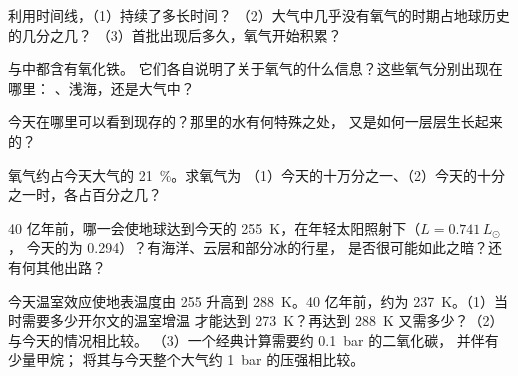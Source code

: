 \begin{exercise}[$\star\star$]\label{exo:g12:early-earth:8}
 利用时间线，（1）持续了多长时间？
 （2）大气中几乎没有氧气的时期占地球历史的几分之几？
 （3）首批出现后多久，氧气开始积累？
\end{exercise}

\begin{exercise}[$\star\star$]\label{exo:g12:early-earth:9}
 与中都含有氧化铁。
 它们各自说明了关于氧气的什么信息？这些氧气分别出现在哪里：
 、浅海，还是大气中？
\end{exercise}

\begin{exercise}[$\star\star$]\label{exo:g12:early-earth:10}
 今天在哪里可以看到现存的？那里的水有何特殊之处，
 又是如何一层层生长起来的？
\end{exercise}

\begin{exercise}[$\star\star$]\label{exo:g12:early-earth:11}
 氧气约占今天大气的 \qty{21}{\percent}。求氧气为
 （1）今天的十万分之一、（2）今天的十分之一时，各占百分之几？
\end{exercise}

\begin{exercise}[$\star\star\star$]\label{exo:g12:early-earth:12}
 40 亿年前，哪一会使地球达到今天的
 \qty{255}{K}，在年轻太阳照射下（$L = 0.741\,L_\odot$，
 今天的为 0.294）？有海洋、云层和部分冰的行星，
 是否很可能如此之暗？还有何其他出路？
\end{exercise}

\begin{exercise}[$\star\star\star$]\label{exo:g12:early-earth:13}
 今天温室效应使地表温度由 255 升高到
 \qty{288}{K}。40 亿年前，约为
 \qty{237}{K}。（1）当时需要多少开尔文的温室增温
 才能达到 \qty{273}{K}？再达到 \qty{288}{K} 又需多少？（2）与今天的情况相比较。
 （3）一个经典计算需要约 \qty{0.1}{bar} 的二氧化碳，
 并伴有少量甲烷；
 将其与今天整个大气约 \qty{1}{bar} 的压强相比较。
\end{exercise}

